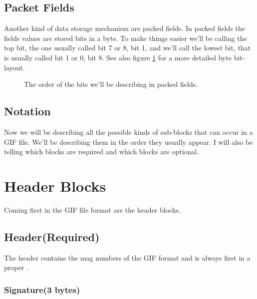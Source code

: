 \begin{refsection}
\begin{algorithm}[H]
\begin{algorithmic}[1]

    \end{algorithmic}
  \end{algorithm}


  \subsection{Packet Fields}

  Another kind of data storage mechanism are packed fields. In packed
  fields the fields values are stored bits in a byte. To make things
  easier we'll be calling the top bit, the one usually called bit 7 or
  8, bit 1, and we'll call the lowest bit, that is usually called bit
  1 or 0, bit 8. See also figure \ref{fig:gif-packed-fields} for a
  more detailed byte bit-layout.

  \begin{figure}
    \centering
    \caption{The order of the bits we'll be describing in packed fields.}
    \label{fig:gif-packed-fields}
  \end{figure}


  \subsection{Notation}

  Now we will be describing all the possible kinds of sub-blocks that
  can occur in a GIF file. We'll be describing them in the order they
  usually appear. I will also be telling which blocks are required and
  which blocks are optional.

  \section{Header Blocks}

  Coming first in the GIF file format are the header blocks.

  \subsection{Header(Required)}

  The header contains the mag numbers of the GIF format and is always
  first in a proper \gif.

  \subsubsection*{Signature(3 bytes)}


\end{refsection}
